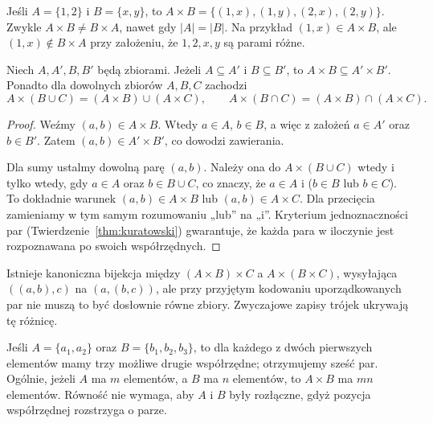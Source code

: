 \begin{przyklad}
Jeśli $A=\{1,2\}$ i $B=\{x,y\}$, to
$A\times B=\{(1,x),(1,y),(2,x),(2,y)\}$.
Zwykle $A\times B\ne B\times A$, nawet gdy
$|A|=|B|$. Na przykład $(1,x)\in A\times B$,
ale $(1,x)\notin B\times A$ przy założeniu, że
$1,2,x,y$ są parami różne.
\end{przyklad}

\begin{twierdzenie}
\label{thm:cart-monotonic}
Niech $A,A',B,B'$ będą zbiorami. Jeżeli
$A\subseteq A'$ i $B\subseteq B'$, to
$A\times B\subseteq A'\times B'$.
Ponadto dla dowolnych zbiorów $A,B,C$ zachodzi
\[
A\times(B\cup C)=(A\times B)\cup(A\times C),\qquad
A\times(B\cap C)=(A\times B)\cap(A\times C).
\]
\end{twierdzenie}
\begin{proof}
Weźmy $(a,b)\in A\times B$. Wtedy $a\in A$, $b\in B$,
a więc z założeń $a\in A'$ oraz $b\in B'$.
Zatem $(a,b)\in A'\times B'$, co dowodzi zawierania.

Dla sumy ustalmy dowolną parę $(a,b)$.
Należy ona do $A\times(B\cup C)$ wtedy i tylko wtedy,
gdy $a\in A$ oraz $b\in B\cup C$, co znaczy,
że $a\in A$ i ($b\in B$ lub $b\in C$).
To dokładnie warunek $(a,b)\in A\times B$ lub
$(a,b)\in A\times C$. Dla przecięcia
zamieniamy w tym samym rozumowaniu „lub” na „i”.
Kryterium jednoznaczności par
(Twierdzenie~\ref{thm:kuratowski}) gwarantuje, że każda para
w iloczynie jest rozpoznawana po swoich współrzędnych.
\end{proof}

\begin{uwaga}
Istnieje kanoniczna bijekcja między $(A\times B)\times C$
a $A\times(B\times C)$, wysyłająca $((a,b),c)$ na
$(a,(b,c))$, ale przy przyjętym kodowaniu uporządkowanych par
nie muszą to być dosłownie równe zbiory.
Zwyczajowe zapisy trójek ukrywają tę różnicę.
\end{uwaga}

\begin{przyklad}
Jeśli $A=\{a_1,a_2\}$ oraz $B=\{b_1,b_2,b_3\}$,
to dla każdego z dwóch pierwszych elementów mamy trzy
możliwe drugie współrzędne; otrzymujemy sześć par.
Ogólnie, jeżeli $A$ ma $m$ elementów, a $B$ ma
$n$ elementów, to $A\times B$ ma $mn$ elementów.
Równość nie wymaga, aby $A$ i $B$ były rozłączne,
gdyż pozycja współrzędnej rozstrzyga o parze.
\end{przyklad}

